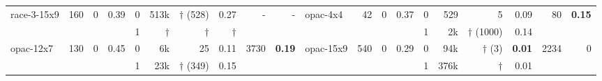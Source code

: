 \begin{table*}[t]
{\begin{tabular}{
l r@{\hskip 12pt}cc@{\hskip 12pt}cr@{\hskip 12pt}rr@{\hskip 12pt} rr@{\hskip 24pt}
l r@{\hskip 12pt}cc@{\hskip 12pt}cr@{\hskip 12pt}rr@{\hskip 12pt} rr
}
\midrule
\multirow{2}{*}{race-3-15x9} & \multirow{2}{*}{160} & \multirow{2}{*}{0} & \multirow{2}{*}{0.39} & 0 & 513k & $\dagger$ (528) & 0.27 & \multirow{2}{*}{-} & \multirow{2}{*}{-} &
\multirow{2}{*}{opac-4x4} & \multirow{2}{*}{42} & \multirow{2}{*}{0} & \multirow{2}{*}{0.37} & 0 & 529 & 5 & 0.09 & \multirow{2}{*}{80} & \multirow{2}{*}{\textbf{0.15}}
\\
& & & & 1 & $\dagger$ & $\dagger$ & $\dagger$ &
& & & & & & 1 & 2k & $\dagger$ (1000) & 0.14
\\

\midrule
\multirow{2}{*}{opac-12x7} & \multirow{2}{*}{130} & \multirow{2}{*}{0} & \multirow{2}{*}{0.45} & 0 & 6k & 25 & 0.11 & \multirow{2}{*}{3730} & \multirow{2}{*}{\textbf{0.19}} &
\multirow{2}{*}{opac-15x9} & \multirow{2}{*}{540} & \multirow{2}{*}{0} & \multirow{2}{*}{0.29} & 0 & 94k & $\dagger$ (3) & \textbf{0.01} & \multirow{2}{*}{2234} & \multirow{2}{*}{0}
\\
& & & & 1 & 23k & $\dagger$ (349) & 0.15 &
& & & & & & 1 & 376k & $\dagger$ & 0.01 & \\

\bottomrule
\end{tabular}
}
\end{table*}








